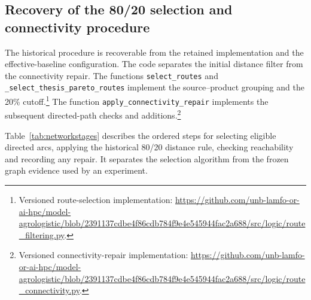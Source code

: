 \documentclass[11pt,a4paper]{article}
\newcommand{\code}[1]{{\small\texttt{#1}}}
\newcommand{\technical}[2]{\footnote{#1: \url{#2}.}}
\begin{document}
\subsection{Recovery of the 80/20 selection and connectivity procedure}

The historical procedure is recoverable from the retained implementation and the effective-baseline configuration. The code separates the initial distance filter from the connectivity repair. The functions \code{select\_routes} and \code{\_select\_thesis\_pareto\_routes} implement the source--product grouping and the 20\% cutoff.\technical{Versioned route-selection implementation}{https://github.com/unb-lamfo-or-ai-hpc/model-agrologistic/blob/2391137cdbe4f86cdb784f9e4e545944fac2a688/src/logic/route_filtering.py} The function \code{apply\_connectivity\_repair} implements the subsequent directed-path checks and additions.\technical{Versioned connectivity-repair implementation}{https://github.com/unb-lamfo-or-ai-hpc/model-agrologistic/blob/2391137cdbe4f86cdb784f9e4e545944fac2a688/src/logic/route_connectivity.py}

Table~\ref{tab:networkstages} describes the ordered steps for selecting eligible directed arcs, applying the historical 80/20 distance rule, checking reachability and recording any repair. It separates the selection algorithm from the frozen graph evidence used by an experiment.
\end{document}
